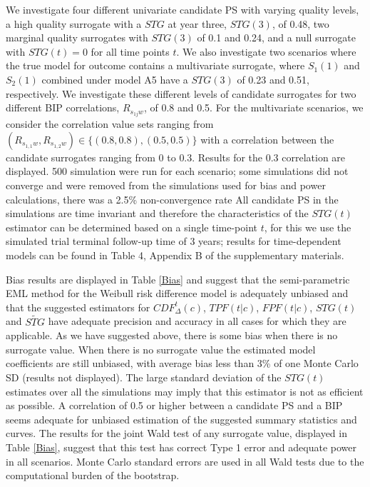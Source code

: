 \documentclass[times, doublespace]{simauth}
\begin{document}
We investigate four different univariate candidate PS with varying quality levels, a high quality surrogate with a $STG$ at year three, $STG(3)$, of 0.48, two marginal quality surrogates with $STG(3)$ of 0.1 and 0.24, and a null surrogate with $STG(t)=0$ for all time points $t$. We also investigate two scenarios where the true model for outcome contains a multivariate surrogate, where $S_1(1)$ and $S_2(1)$ combined under model A5 have a $STG(3)$ of 0.23 and 0.51, respectively. We investigate these different levels of candidate surrogates for two different BIP correlations, $R_{s_{1j}w}$, of 0.8 and 0.5. For the multivariate scenarios, we consider the correlation value sets ranging from $(R_{s_{1,1}w},R_{s_{1,2}w})\in\{(0.8,0.8), (0.5, 0.5)\}$ with a correlation between the candidate surrogates ranging from 0 to 0.3. Results for the 0.3 correlation are displayed. 500 simulation were run for each scenario; some simulations did not converge and were removed from the simulations used for bias and power calculations, there was a 2.5\% non-convergence rate  All candidate PS in the simulations are time invariant and therefore the characteristics of the $STG(t)$ estimator can be determined based on a single time-point $t$, for this we use the simulated trial terminal follow-up time of  3 years; results for time-dependent models can be found in Table 4, Appendix B of the supplementary materials. 

Bias results are displayed in Table \ref{Bias} and suggest that the semi-parametric EML method for the Weibull risk difference model is adequately unbiased and that the suggested estimators for $CDF^{t}_{\Delta}(c)$, $TPF(t|c)$, $FPF(t|c)$, $STG(t)$ and $\widetilde{STG}$ have adequate precision and accuracy in all cases for which they are applicable. As we have suggested above, there is some bias when there is no surrogate value. When there is no surrogate value the estimated model coefficients are still unbiased, with average bias less than 3\% of one Monte Carlo SD (results not displayed). The large standard deviation of the $STG(t)$ estimates over all the simulations may imply that this estimator is not as efficient as possible. A correlation of 0.5 or higher between a candidate PS and a BIP seems adequate for unbiased estimation of the suggested summary statistics and curves. The results for the joint Wald test of any surrogate value, displayed in Table \ref{Bias}, suggest that this test has correct Type 1 error and adequate power in all scenarios. Monte Carlo standard errors are used in all Wald tests due to the computational burden of the bootstrap.
\end{document}
